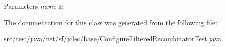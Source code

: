 \begin{DoxyParams}{Parameters}
{\em name} & \\
\hline
\end{DoxyParams}


The documentation for this class was generated from the following file\-:\begin{DoxyCompactItemize}
\item 
src/test/java/net/sf/jclec/base/Configure\-Filtered\-Recombinator\-Test.\-java\end{DoxyCompactItemize}
